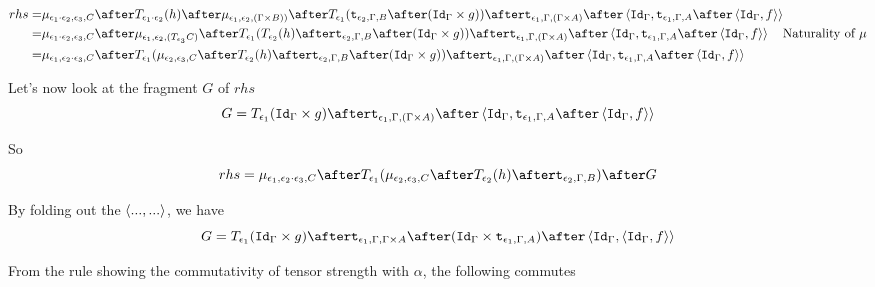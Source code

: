 {\begin{equation}
    \begin{split}
        rhs = &\bind{\e_1\dot\e_2}{\e_3}{C}\after\T{\e_1\dot\e_2}{(h)}\after\bind{\e_1}{\e_2}{(\G \times B))} \after \T{\e_1}{(\tstrength{\e_2}{\G}{B} \after (\idg \times g))} \after \tstrength{\e_1}{\G}{(\G \times A)} \after \pr{\idg}{\tstrength{\e_1}{\G}{A}\after\pr{\idg}{f}}\\
        = &\bind{\e_1\dot\e_2}{\e_3}{C}\after\bind{\e_1}{\e_2}{(\T{\e_3}{C})}\after\T{\e_1}{(\T{\e_2}{(h)} \after \tstrength{\e_2}{\G}{B} \after (\idg \times g))} \after \tstrength{\e_1}{\G}{(\G \times A)} \after \pr{\idg}{\tstrength{\e_1}{\G}{A}\after\pr{\idg}{f}}\qt{Naturality of $\mu$}\\
        = & \bind{\e_1}{\e_2\dot\e_3}{C}\after\T{\e_1}{(\bind{\e_2}{\e_3}{C}\after \T{\e_2}{(h)} \after \tstrength{\e_2}{\G}{B} \after (\idg \times g))} \after \tstrength{\e_1}{\G}{(\G \times A)} \after \pr{\idg}{\tstrength{\e_1}{\G}{A}\after\pr{\idg}{f}}
    \end{split}
\end{equation}

Let's now look at the fragment $G$ of $rhs$
\begin{equation}
    G = \T{\e_1}{(\idg\times g)}\after\tstrength{\e_1}{\G}{(\G\times A)}\after\pr{\idg}{\tstrength{\e_1}{\G}{A}\after\pr{\idg}{f}}
\end{equation}

So
\begin{equation}
    rhs = \bind{\e_1}{\e_2\dot\e_3}{C}\after\T{\e_1}{(\bind{\e_2}{\e_3}{C}\after \T{\e_2}{(h)} \after \tstrength{\e_2}{\G}{B})}\after G
\end{equation}


By folding out the $\left\langle..., ...\right\rangle$, we have
\begin{equation}
    G = \T{\e_1}{(\idg\times g)}\after\tstrength{\e_1}{\G}{\G \times A}\after(\idg\times\tstrength{\e_1}{\G}{A})\after\pr{\idg}{\pr{\idg}{f}}
\end{equation}

From the rule  showing the commutativity of tensor strength with $\alpha$, the following commutes


}
